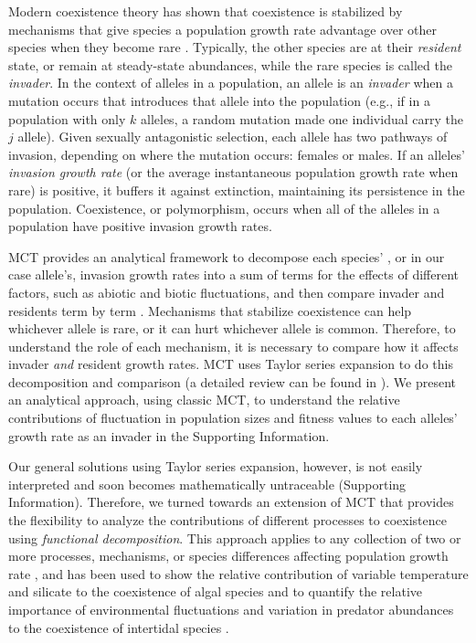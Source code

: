 \documentclass[]{article}
\begin{document}
Modern coexistence theory has shown that coexistence is stabilized by mechanisms that give species a population growth rate advantage over other species when they become rare \citep{chesson_stabilizing_1982, chesson2003quantifying, barabas_chessons_2018}. Typically, the other species are at their \textit{resident} state, or remain at steady-state abundances, while the rare species is called the \textit{invader}. In the context of alleles in a population, an allele is an \textit{invader} when a mutation occurs that introduces that allele into the population (e.g., if in a population with only $k$ alleles, a random mutation made one individual carry the $j$ allele). Given sexually antagonistic selection, each allele has two pathways of invasion, depending on where the mutation occurs: females or males. If an alleles' \textit{invasion growth rate} (or the average instantaneous population growth rate when rare) is positive, it buffers it against extinction, maintaining its persistence in the population.  Coexistence, or polymorphism, occurs when all of the alleles in a population have positive invasion growth rates.

MCT provides an analytical framework to decompose each species' , or in our case allele's, invasion growth rates into a sum of terms for the effects of different factors, such as abiotic and biotic fluctuations, and then compare invader and residents term by term \citep{ellner_expanded_2019}. Mechanisms that stabilize coexistence can help whichever allele is rare, or it can hurt whichever allele is common. Therefore, to understand the role of each mechanism, it is necessary to compare how it affects invader \textit{and} resident growth rates. MCT uses Taylor series expansion to do this decomposition and comparison (a detailed review can be found in \citet{barabas_chessons_2018}). We present an analytical approach, using classic MCT, to understand the relative contributions of fluctuation in population sizes and fitness values to each alleles' growth rate as an invader in the Supporting Information.

Our general solutions using Taylor series expansion, however, is not easily interpreted and soon becomes mathematically untraceable (Supporting Information). Therefore, we turned towards an extension of MCT \citep{ellner_expanded_2019} that provides the flexibility to analyze the contributions of different processes to coexistence using \textit{functional decomposition}. This approach applies to any collection of two or more processes, mechanisms, or species differences affecting population growth rate \citep{ ellner2016quantify, ellner_expanded_2019}, and has been used to show the relative contribution of variable temperature and silicate to the coexistence of algal species \citep{ellner2016quantify} and to quantify the relative importance of environmental fluctuations and variation in predator abundances to the coexistence of intertidal species \citep{shoemaker2020}.
\end{document}
